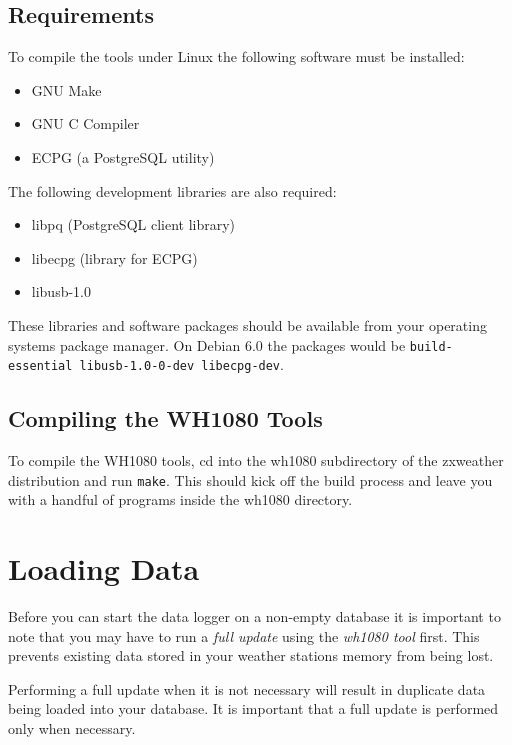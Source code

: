 \documentclass[a4paper,10pt,draft]{book}
\begin{document}
\subsection{Requirements}
To compile the tools under Linux the following software must be installed:
\begin{itemize}
\item GNU Make
\item GNU C Compiler
\item ECPG (a PostgreSQL utility)
\end{itemize}

The following development libraries are also required:
\begin{itemize}
\item libpq (PostgreSQL client library)
\item libecpg (library for ECPG)
\item libusb-1.0
\end{itemize}

These libraries and software packages should be available from your operating systems package manager. On Debian 6.0 the packages would be \verb|build-essential libusb-1.0-0-dev libecpg-dev|.

\subsection{Compiling the WH1080 Tools}


To compile the WH1080 tools, cd into the wh1080 subdirectory of the zxweather distribution and run \verb|make|. This should kick off the build process and leave you with a handful of programs inside the wh1080 directory.

\section{Loading Data}
\label{sec_loading_data}

Before you can start the data logger on a non-empty database it is important to note that you may have to run a \emph{full update} using the \emph{wh1080 tool} first. This prevents existing data stored in your weather stations memory from being lost.

Performing a full update when it is not necessary will result in duplicate data being loaded into your database. It is important that a full update is performed only when necessary.
\end{document}
